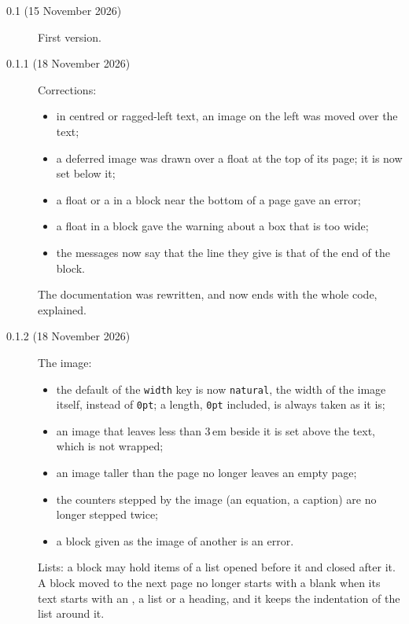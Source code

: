 \documentclass[a4paper,11pt]{article}
\newcommand\key[1]{\texttt{#1}}
\begin{document}
\begin{description}
\item[0.1 (15 November 2026)] First version.
\item[0.1.1 (18 November 2026)] Corrections:
  \begin{itemize}
  \item in centred or ragged-left text, an image on the left was moved over the text;
  \item a deferred image was drawn over a float at the top of its page; it is now set below it;
  \item a float or a  in a block near the bottom of a page gave an error;
  \item a float in a block gave the warning about a box that is too wide;
  \item the messages now say that the line they give is that of the end of the block.
  \end{itemize}
  The documentation was rewritten, and now ends with the whole code, explained.
\item[0.1.2 (18 November 2026)] The image:
  \begin{itemize}
  \item the default of the \key{width} key is now \texttt{natural}, the width of the image itself, instead of \texttt{0pt}; a length, \texttt{0pt} included, is always taken as it is;
  \item an image that leaves less than 3\,em beside it is set above the text, which is not wrapped;
  \item an image taller than the page no longer leaves an empty page;
  \item the counters stepped by the image (an equation, a caption) are no longer stepped twice;
  \item a block given as the image of another is an error.
  \end{itemize}
  Lists: a block may hold items of a list opened before it and closed after it. A block moved to the next page no longer starts with a blank when its text starts with an , a list or a heading, and it keeps the indentation of the list around it.


\end{description}
\end{document}

